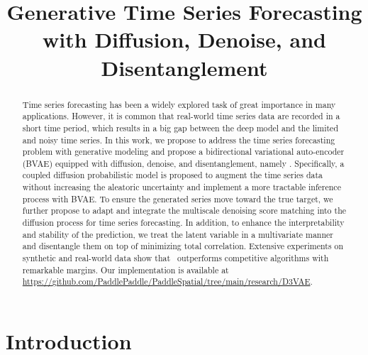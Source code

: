 \title{Generative Time Series Forecasting with Diffusion, Denoise, and Disentanglement}



\maketitle

\begin{abstract}

Time series forecasting has been a widely explored task of great importance in many applications.
However, it is common that real-world time series data are recorded in a short time period, which results in a big gap between the deep model and the limited and noisy time series. 
In this work, we propose to address the time series forecasting problem with generative modeling and propose a bidirectional variational auto-encoder (BVAE) equipped with diffusion, denoise, and disentanglement, namely \ourmodel.
Specifically, a coupled diffusion probabilistic model is proposed to augment the time series data without increasing the aleatoric uncertainty and implement a more tractable inference process with BVAE. 
To ensure the generated series move toward the true target, we further propose to adapt and integrate the multiscale denoising score matching into the diffusion process for time series forecasting. 
In addition, to enhance the interpretability and stability of the prediction, we treat the latent variable in a multivariate manner and disentangle them on top of minimizing total correlation. 
Extensive experiments on synthetic and real-world data show that \ourmodel~outperforms competitive algorithms with remarkable margins. 
Our implementation is available at \url{https://github.com/PaddlePaddle/PaddleSpatial/tree/main/research/D3VAE}. 

\end{abstract}

\setcounter{footnote}{0}

\section{Introduction}

